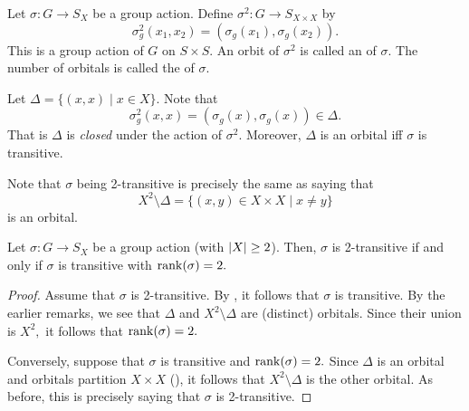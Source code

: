 \begin{defn}%
	Let $\sigma : G \to S_X$ be a group action. Define $\sigma^2 : G \to S_{X \times X}$ by
	\begin{equation*} 
		\sigma_g^2(x_1, x_2) = (\sigma_g(x_1), \sigma_g(x_2)).
	\end{equation*}
	This is a group action of $G$ on $S \times S.$ An orbit of $\sigma^2$ is called an  of $\sigma.$ The number of orbitals is called the  of $\sigma.$
\end{defn}

\begin{rem}
	Let $\Delta = \{(x, x) \mid x \in X\}.$ Note that 
	\begin{equation*} 
		\sigma_g^2(x, x) = (\sigma_g(x), \sigma_g(x)) \in \Delta.
	\end{equation*}
	That is $\Delta$ is \emph{closed} under the action of $\sigma^2.$ Moreover, $\Delta$ is an orbital iff $\sigma$ is transitive.
\end{rem}

\begin{rem}
	Note that $\sigma$ being 2-transitive is precisely the same as saying that
	\begin{equation*} 
		X^2 \setminus \Delta = \{(x, y) \in X \times X \mid x \neq y\}
	\end{equation*}
	is an orbital.
\end{rem}

\begin{prop} \label{prop:2transiffrank2}
	Let $\sigma : G \to S_X$ be a group action (with ${\left\lvert X \right\lvert} \ge 2$). Then, $\sigma$ is 2-transitive if and only if $\sigma$ is transitive with $\operatorname{rank}(\sigma) = 2.$
\end{prop}

\begin{proof} 
	Assume that $\sigma$ is 2-transitive. By , it follows that $\sigma$ is transitive. By the earlier remarks, we see that $\Delta$ and $X^2 \setminus \Delta$ are (distinct) orbitals. Since their union is $X^2,$ it follows that $\operatorname{rank}(\sigma) = 2.$

	Conversely, suppose that $\sigma$ is transitive and $\operatorname{rank}(\sigma) = 2.$ Since $\Delta$ is an orbital and orbitals partition $X \times X$ (), it follows that $X^2 \setminus \Delta$ is the other orbital. As before, this is precisely saying that $\sigma$ is 2-transitive.
\end{proof}
	
